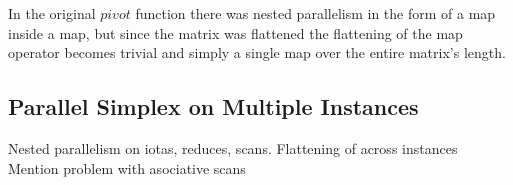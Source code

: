 In the original $pivot$ function there was nested parallelism in the form of a map inside a map, but since the matrix was flattened the flattening of the map operator becomes trivial and simply a single map over the entire matrix's length.

\subsection{Parallel Simplex on Multiple Instances}
Nested parallelism on iotas, reduces, scans.
Flattening of across instances
Mention problem with asociative scans
